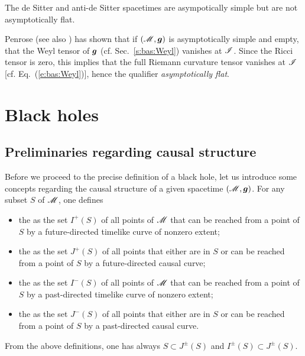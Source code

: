 \begin{example}
The de Sitter and anti-de Sitter spacetimes are asympotically simple but
are not asymptotically flat.
\end{example}

Penrose \cite{Penro65b} (see also \cite{Fraue04}) has shown that if $(\mathscr{M},\bm{g})$
is asymptotically simple and empty, that the Weyl tensor of $\bm{g}$ (cf. Sec.~\ref{s:bas:Weyl})
vanishes at $\mathscr{I}$. Since the
Ricci tensor is zero, this implies that the full Riemann curvature tensor vanishes
at $\mathscr{I}$ [cf. Eq.~(\ref{e:bas:Weyl})], hence the qualifier \emph{asymptotically flat}.


\section{Black holes} \label{s:glo:BH}

\subsection{Preliminaries regarding causal structure}

Before we proceed to the precise definition of a black hole, let us introduce
some concepts regarding the causal structure of a given spacetime $(\mathscr{M},\bm{g})$.
For any subset $S$ of $\mathscr{M}$, one defines
\begin{itemize}
\item the  as the set $I^+(S)$ of all
points of $\mathscr{M}$ that can be reached from a point of $S$ by a future-directed
timelike curve of nonzero extent;
\item the  as the set $J^+(S)$ of
all points that either are in $S$ or can be reached from a point of $S$ by a future-directed
causal curve;
\item the  as the set $I^-(S)$ of all
points of $\mathscr{M}$ that can be reached from a point of $S$ by a past-directed
timelike curve of nonzero extent;
\item the  as the set $J^-(S)$ of
all points that either are in $S$ or can be reached from a point of $S$ by a past-directed
causal curve.
\end{itemize}
From the above definitions, one has always $S \subset J^\pm(S)$ and
$I^\pm(S) \subset J^\pm(S)$.

